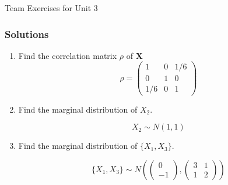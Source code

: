 \documentclass{beamer}
\begin{document}
\begin{frame}
\begin{center}
\Huge Team Exercises for Unit 3
\end{center}
\end{frame}

\begin{frame}
\frametitle{Solutions}
\begin{enumerate}
\item Find the correlation matrix $\rho$ of $\mathbf{X}$
$$\rho = \begin{pmatrix}
1 & 0 & 1/6\\
0 & 1 & 0\\
1/6 & 0 & 1
\end{pmatrix}$$

\item Find the marginal distribution of $X_2$.

$$ X_2 \sim N(1, 1)$$
\item Find the marginal distribution of $\{X_1, X_3\}$.

$$\{X_1, X_3\} \sim N\left(\begin{pmatrix} 0 \\ -1 \end{pmatrix} , \begin{pmatrix} 3 & 1 \\ 1 & 2 \end{pmatrix}\right)$$
\end{enumerate}
\end{frame}
\end{document}
